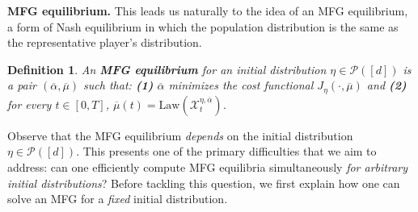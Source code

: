 \documentclass[11pt,reqno]{amsart}
\numberwithin{equation}{section}
\theoremstyle{plain}
\newtheorem{definition}{Definition}[section]
\newcommand{\calP}{{\mathcal P}}
\newcommand{\calX}{{\mathcal X}}
\newcommand{\1}{\boldsymbol{\mathbbm{1}}}
\begin{document}
\noindent\textbf{MFG equilibrium.} 
This leads us naturally to the idea of an MFG equilibrium, a form of Nash equilibrium in which the population distribution is the same as the representative player's distribution.
\begin{definition}
\label{def:mfg-equilibrium}
An \textbf{MFG equilibrium} for an initial distribution $\eta \in \calP([d])$ is a pair $(\overline{\alpha}, \overline{\mu})$ such that: {\bf (1)} $\overline{\alpha}$ minimizes the cost functional $J_\eta(\cdot, \overline{\mu})$ and {\bf (2)} for every $t \in [0, T]$, $\overline{\mu}(t) = \mathrm{Law}(\calX_t^{\eta, \overline{\alpha}})$.
\end{definition}
Observe that the MFG equilibrium \emph{depends} on the initial distribution $\eta \in \calP([d])$. This presents one of the primary difficulties that we aim to address: can one efficiently compute MFG equilibria simultaneously \emph{for arbitrary initial distributions}? Before tackling this question, we first explain how one can solve an MFG for a \emph{fixed} initial distribution.
\end{document}
